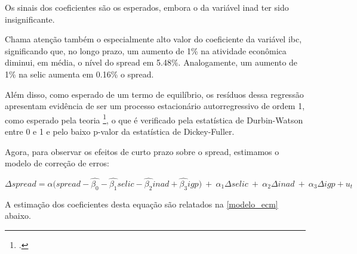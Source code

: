 \documentclass[a4paper,
               article,
               12pt,
               openany,
               oneside,
               english,
               brazil]{abntex2}
\numberwithin{equation}{section}
\begin{document}
    Os sinais dos coeficientes são os esperados, embora o da variável inad ter sido insignificante. 
    
    Chama atenção também o especialmente alto valor do coeficiente da variável ibc, significando que, no longo prazo, um aumento de 1\% na atividade econômica diminui, em média, o nível do spread em 5.48\%. Analogamente, um aumento de 1\% na selic aumenta em 0.16\% o spread.

    Além disso, como esperado de um termo de equilíbrio, os resíduos dessa regressão apresentam evidência de ser um processo estacionário autorregressivo de ordem 1, como esperado pela teoria \footcite[12]{coint1}, o que é verificado pela estatística de Durbin-Watson entre 0 e 1 e pelo baixo p-valor da estatística de Dickey-Fuller.

    Agora, para observar os efeitos de curto prazo sobre o spread, estimamos o modelo de correção de erros:

    \begin{equation*}
        \Delta \textit{spread} = \alpha (\textit{spread} - \hat{\beta_0} - \hat{\beta_1} \textit{selic} -\hat{\beta_2} \textit{inad} + \hat{\beta_3} \textit{igp)}\ +\ \alpha_1 \Delta \textit{selic}\ +\ \alpha_2 \Delta \textit{inad}\ +\ \alpha_3 \Delta \textit{igp} + u_t
    \end{equation*}

    A estimação dos coeficientes desta equação são relatados na \autoref{modelo_ecm} abaixo.
\end{document}
